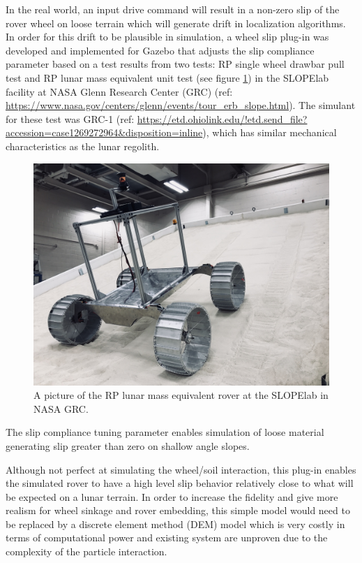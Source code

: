\documentclass[twocolumn,letterpaper]{IEEEAerospaceCLS}  %
\begin{document}
In the real world, an input drive command will result in a non-zero slip of the rover wheel on loose terrain which will generate drift in localization algorithms.
In order for this drift to be plausible in simulation, a wheel slip plug-in was developed and implemented for Gazebo that adjusts the slip compliance parameter based on a test results from two tests: RP single wheel drawbar pull test and RP lunar mass equivalent unit test (see figure \ref{fig:mgru}) in the SLOPElab facility at NASA Glenn Research Center (GRC) (ref: \url{https://www.nasa.gov/centers/glenn/events/tour_erb_slope.html}). 
The simulant for these test was GRC-1 (ref: \url{https://etd.ohiolink.edu/!etd.send_file?accession=case1269272964&disposition=inline}), which has similar mechanical characteristics as the lunar regolith.
\begin{figure}[h!]
	\includegraphics[width=\columnwidth]{figures/wheel_slip_MGRU.JPG}
   	\caption{A picture of the RP lunar mass equivalent rover at the SLOPElab in NASA GRC.}
    \label{fig:mgru}
\end{figure}
The slip compliance tuning parameter enables simulation of loose material generating slip greater than zero on shallow angle slopes.

Although not perfect at simulating the wheel/soil interaction, this plug-in enables the simulated rover to have a high level slip behavior relatively close to what will be expected on a lunar terrain. 
In order to increase the fidelity and give more realism for wheel sinkage and rover embedding, this simple model would need to be replaced by a discrete element method (DEM) model which is very costly in terms of computational power and existing system are unproven due to the complexity of the particle interaction.
\end{document}
